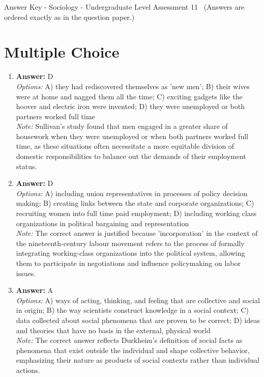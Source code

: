 \documentclass[12pt]{article}
\begin{document}
\begin{center}
Answer Key - Sociology - Undergraduate Level Assessment 11 \
\small (Answers are ordered exactly as in the question paper.)
\end{center}

\section*{Multiple Choice}
\begin{enumerate}[label=\arabic*.]
\item \textbf{Answer:} D
\\ \textit{Options:} A) they had rediscovered themselves as 'new men'; B) their wives were at home and nagged them all the time; C) exciting gadgets like the hoover and electric iron were invented; D) they were unemployed or both partners worked full time
\\ \textit{Note:} Sullivan's study found that men engaged in a greater share of housework when they were unemployed or when both partners worked full time, as these situations often necessitate a more equitable division of domestic responsibilities to balance out the demands of their employment status.
\item \textbf{Answer:} D
\\ \textit{Options:} A) including union representatives in processes of policy decision making; B) creating links between the state and corporate organizations; C) recruiting women into full time paid employment; D) including working class organizations in political bargaining and representation
\\ \textit{Note:} The correct answer is justified because 'incorporation' in the context of the nineteenth-century labour movement refers to the process of formally integrating working-class organizations into the political system, allowing them to participate in negotiations and influence policymaking on labor issues.
\item \textbf{Answer:} A
\\ \textit{Options:} A) ways of acting, thinking, and feeling that are collective and social in origin; B) the way scientists construct knowledge in a social context; C) data collected about social phenomena that are proven to be correct; D) ideas and theories that have no basis in the external, physical world
\\ \textit{Note:} The correct answer reflects Durkheim's definition of social facts as phenomena that exist outside the individual and shape collective behavior, emphasizing their nature as products of social contexts rather than individual actions.

\end{enumerate}
\end{document}
